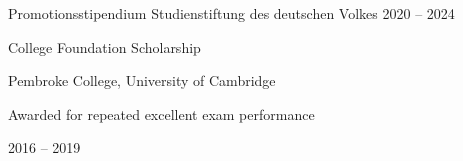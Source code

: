 
\begin{cvhonors}

  \cvhonor
    {Promotionsstipendium} %
    {Studienstiftung des deutschen Volkes} %
    {} %
    {2020 -- 2024} %


\end{cvhonors}

\begin{cvhonors}

  \cvhonor
    {College Foundation Scholarship} %
    {%
      Pembroke College, University of Cambridge\newline~
      \begin{cvitems}
        \item {Awarded for repeated excellent exam performance}
      \end{cvitems}
    } %
    {} %
    {2016 -- 2019} %


\end{cvhonors}
